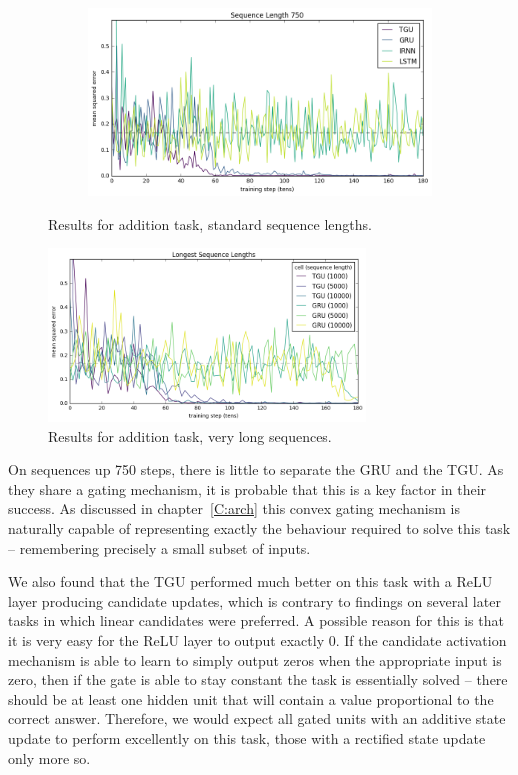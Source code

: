 \begin{figure}
\begin{subfigure}[t]{0.75\textwidth}
\includegraphics[width=\textwidth]{exps/addition/sl750}
\caption{}
\label{fig:add750}
\end{subfigure}

\caption{Results for addition task, standard sequence lengths.}
\label{fig:addresults}
\end{figure}

\begin{figure}
\centering
\includegraphics[width=0.75\textwidth]{exps/addition/long}
\caption{Results for addition task, very long sequences.}
\end{figure}

On sequences up 750 steps, there is little to separate the GRU and the TGU. As they share a gating
mechanism, it is probable that this is a key factor in their success. As discussed in
chapter~\ref{C:arch} this convex gating mechanism is naturally capable of representing exactly the
behaviour required to solve this task -- remembering precisely a small subset of inputs.

We also
found that the TGU performed much better on this task with a ReLU layer producing candidate updates,
which is contrary to findings on several later tasks in which linear candidates were preferred.
A possible reason for this is that it is very easy for the ReLU layer to output exactly \(0\).
If the candidate activation mechanism is able to learn to simply output zeros when the appropriate
input is zero, then if the gate is able to stay constant the task is essentially solved -- there should
be at least one hidden unit that will contain a value proportional to the correct answer. Therefore,
we would expect all gated units with an additive state update to perform excellently on this task, those
with a rectified state update only more so.

